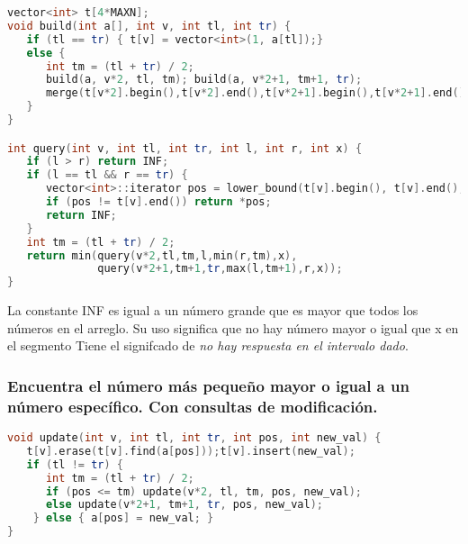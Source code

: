 \begin{lstlisting}[language=C++]
vector<int> t[4*MAXN];
void build(int a[], int v, int tl, int tr) {
   if (tl == tr) { t[v] = vector<int>(1, a[tl]);} 
   else {
      int tm = (tl + tr) / 2;
      build(a, v*2, tl, tm); build(a, v*2+1, tm+1, tr);
      merge(t[v*2].begin(),t[v*2].end(),t[v*2+1].begin(),t[v*2+1].end(),back_inserter(t[v]));
   }
}

int query(int v, int tl, int tr, int l, int r, int x) {
   if (l > r) return INF;
   if (l == tl && r == tr) {
      vector<int>::iterator pos = lower_bound(t[v].begin(), t[v].end(), x);
      if (pos != t[v].end()) return *pos;
      return INF;
   }
   int tm = (tl + tr) / 2;
   return min(query(v*2,tl,tm,l,min(r,tm),x),
              query(v*2+1,tm+1,tr,max(l,tm+1),r,x));
}
\end{lstlisting}

La constante INF es igual a un número grande que es mayor que todos los números en el arreglo. Su uso significa que no hay número mayor o igual que x en el segmento Tiene el signifcado de \emph{no hay respuesta en el intervalo dado}.

\subsubsection{Encuentra el número más pequeño mayor o igual a un número específico. Con consultas de modificación.}

\begin{lstlisting}[language=C++]
void update(int v, int tl, int tr, int pos, int new_val) {
   t[v].erase(t[v].find(a[pos]));t[v].insert(new_val);
   if (tl != tr) {
      int tm = (tl + tr) / 2;
      if (pos <= tm) update(v*2, tl, tm, pos, new_val);
      else update(v*2+1, tm+1, tr, pos, new_val);
	} else { a[pos] = new_val; }
}
\end{lstlisting}



